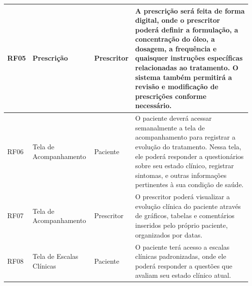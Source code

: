 \href{}{}\documentclass[12pt,portuguese,oneside]{article}
\begin{document}
\begin{table}[H]
\begin{tabularx}{\textwidth}{|>{\raggedright\arraybackslash}p{1cm}|>{\raggedright\arraybackslash}p{2.5cm}|>{\raggedright\arraybackslash}p{2cm}|>{\raggedright\arraybackslash}X|}
\hline
RF05 & Prescrição & Prescritor & A prescrição será feita de forma digital, onde o prescritor poderá definir a formulação, a concentração do óleo, a dosagem, a frequência e quaisquer instruções específicas relacionadas ao tratamento. O sistema também permitirá a revisão e modificação de prescrições conforme necessário.\\
\hline
RF06 & Tela de Acompanhamento & Paciente & O paciente deverá acessar semanalmente a tela de acompanhamento para registrar a evolução do tratamento. Nessa tela, ele poderá responder a questionários sobre seu estado clínico, registrar sintomas, e outras informações pertinentes à sua condição de saúde.\\
\hline
RF07 & Tela de Acompanhamento & Prescritor & O prescritor poderá visualizar a evolução clínica do paciente através de gráficos, tabelas e comentários inseridos pelo próprio paciente, organizados por datas.\\
\hline
RF08 & Tela de Escalas Clínicas & Paciente & O paciente terá acesso a escalas clínicas padronizadas, onde ele poderá responder a questões que avaliam seu estado clínico atual.\\
\hline
\end{tabularx}
\end{table}

\newpage
\end{document}
